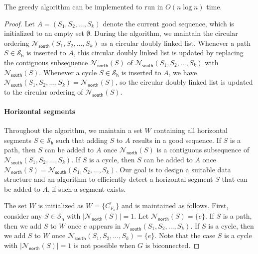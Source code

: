 \documentclass{article}\usepackage[a4paper,margin=20mm]{geometry}
\newcommand{\FO}{F_\mathsf{o}}
\newcommand{\PH}{\mathcal{S}_\mathsf{h}}
\newcommand{\Nnorth}{\mathcal{N}_\mathsf{north}}
\newcommand{\Nsouth}{\mathcal{N}_\mathsf{south}}
\begin{document}
\begin{lemma}\label{lem-time-sequence}
The greedy algorithm can be implemented to run in $O(n \log n)$ time.
\end{lemma}
\begin{proof}
 Let $A=(S_1, S_2, \ldots, S_k)$ denote the current good sequence, which is initialized to an empty set $\emptyset$.
 During the algorithm, we  maintain the circular ordering  $\Nsouth(S_1, S_2, \ldots, S_{k})$ as a circular doubly linked list. Whenever a path $S \in \PH$ is inserted to $A$, this circular doubly linked list is updated by replacing the contiguous subsequence $\Nnorth(S)$ of  $\Nsouth(S_1, S_2, \ldots, S_{k})$ with $\Nsouth(S)$. Whenever a cycle $S \in \PH$ is inserted to $A$, we have $\Nsouth(S_1, S_2, \ldots, S_{k}) = \Nnorth(S)$, so the circular doubly linked list is updated to the circular ordering 
 of $\Nsouth(S)$.
 
 \paragraph{Horizontal segments}
 Throughout the algorithm, we maintain a set $W$ containing all horizontal segments $S \in \PH$ such that adding $S$ to $A$ results in a good sequence. If $S$ is a path, then $S$ can  be added to $A$ once $\Nnorth(S)$ is a  contiguous subsequence of $\Nsouth(S_1, S_2, \ldots, S_{k})$. If $S$ is a cycle, then $S$ can  be added to $A$ once $\Nnorth(S) = \Nsouth(S_1, S_2, \ldots, S_{k})$. Our goal is to design a suitable data structure and an algorithm to efficiently detect a horizontal segment $S$ that can be added to $A$, if such a segment exists.

 The set $W$ is initialized as $W=\{\overline{C_{\FO}}\}$ and is maintained as follows. 
 First, consider any $S \in \PH$ with $|\Nnorth(S)| = 1$.  Let $\Nnorth(S) = \{e\}$.  If $S$ is a path, then we add $S$ to $W$ once $e$ appears in $\Nsouth(S_1, S_2, \ldots, S_{k})$. If $S$ is a cycle, then we add $S$ to $W$ once $\Nsouth(S_1, S_2, \ldots, S_{k})=\{e\}$. Note that the case $S$ is a cycle with $|\Nnorth(S)| = 1$ is not possible when $G$ is biconnected.
 

\end{proof}
\end{document}
